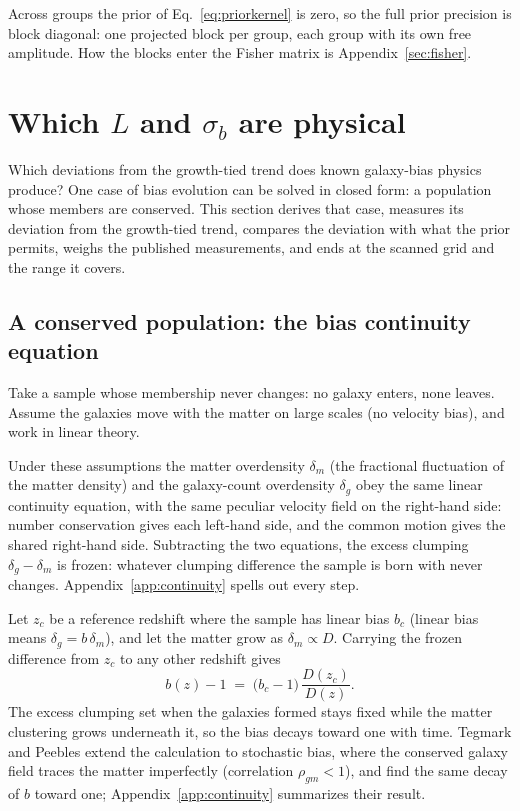 \documentclass[11pt]{article}
\begin{document}
Across groups the prior of Eq.~\eqref{eq:priorkernel} is zero, so the
full prior precision is block diagonal: one projected block per
group, each group with its own free amplitude.  How the blocks enter
the Fisher matrix is Appendix~\ref{sec:fisher}.

\section{Which $L$ and $\sigma_b$ are physical}
\label{sec:physical}

Which deviations from the growth-tied trend does known galaxy-bias physics
produce?  One case of bias evolution can be solved in closed form: a
population whose members are conserved.  This section derives that
case, measures its deviation from the growth-tied trend, compares the
deviation with what the prior permits, weighs the published
measurements, and ends at the scanned grid and the range it covers.

\subsection{A conserved population: the bias continuity equation}
\label{sec:conserved}

Take a sample whose membership never changes: no galaxy enters, none
leaves.  Assume the galaxies move with the matter on large scales (no
velocity bias), and work in linear theory.

Under these assumptions the matter overdensity $\delta_m$ (the
fractional fluctuation of the matter density) and the galaxy-count
overdensity $\delta_g$ obey the same linear continuity equation, with
the same peculiar velocity field on the right-hand side: number
conservation gives each left-hand side, and the common motion gives
the shared right-hand side.  Subtracting the two equations, the
excess clumping $\delta_g - \delta_m$ is frozen: whatever clumping
difference the sample is born with never changes.
Appendix~\ref{app:continuity} spells out every step.

Let $z_c$ be a reference redshift where the sample has linear bias
$b_c$ (linear bias means $\delta_g = b\,\delta_m$), and let the
matter grow as $\delta_m \propto D$.  Carrying the frozen difference
from $z_c$ to any other redshift gives \cite{Fry1996}
\begin{equation}
  b(z) - 1
  \;=\;
  \bigl(b_c - 1\bigr)\,\frac{D(z_c)}{D(z)} .
  \label{eq:fry}
\end{equation}
The excess clumping set when the galaxies formed stays fixed while
the matter clustering grows underneath it, so the bias decays toward
one with time.  Tegmark and Peebles \cite{TegmarkPeebles1998} extend
the calculation to stochastic bias, where the conserved galaxy field
traces the matter imperfectly (correlation $\rho_{gm} < 1$), and find
the same decay of $b$ toward one;
Appendix~\ref{app:continuity} summarizes their result.
\end{document}
